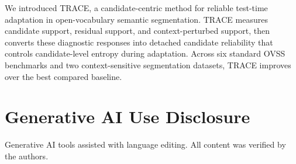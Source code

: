 \documentclass[letterpaper]{article}
\newcommand{\method}{TRACE\xspace}
\begin{document}
	We introduced \method, a candidate-centric method for reliable test-time adaptation in open-vocabulary semantic segmentation. \method measures candidate support, residual support, and context-perturbed support, then converts these diagnostic responses into detached candidate reliability that controls candidate-level entropy during adaptation. Across six standard OVSS benchmarks and two context-sensitive segmentation datasets, \method improves over the best compared baseline.
	
	\section{Generative AI Use Disclosure}
	Generative AI tools assisted with language editing. All content was verified by the authors.
	
	
	
	
	
\end{document}
